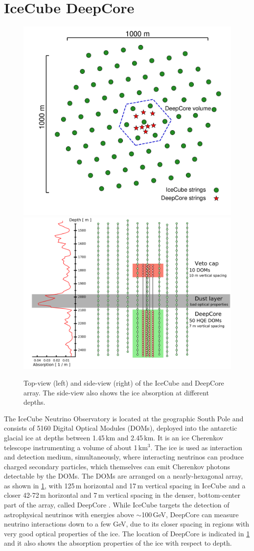 \documentclass[a4paper,11pt]{article}
\begin{document}
\section{IceCube DeepCore}

\begin{figure}[h]
  \includegraphics[width=.43\linewidth]{figures/icecube_top_view_bw.pdf}
  \includegraphics[width=.52\linewidth]{figures/DeepCore_sideview.png}
  \caption{Top-view (left) and side-view (right) of the IceCube and DeepCore array. The side-view also shows the ice absorption at different depths.}
  \label{fig:icecube_array}
\end{figure}

The IceCube Neutrino Observatory \cite{Aartsen:2016nxy} is located at the geographic South Pole and consists of 5160 Digital Optical Modules (DOMs), deployed into the antarctic glacial ice at depths between 1.45\,km and 2.45\,km. It is an ice Cherenkov telescope instrumenting a volume of about 1\,km$^{3}$. The ice is used as interaction and detection medium, simultaneously, where interacting neutrinos can produce charged secondary particles, which themselves can emit Cherenkov photons detectable by the DOMs. The DOMs are arranged on a nearly-hexagonal array, as shown in \cref{fig:icecube_array}, with 125\,m horizontal and 17\,m vertical spacing in IceCube and a closer 42-72\,m horizontal and 7\,m vertical spacing in the denser, bottom-center part of the array, called DeepCore \cite{IceCube:2011ucd}. While IceCube targets the detection of astrophysical neutrinos with energies above $\sim$100\,GeV, DeepCore can measure neutrino interactions down to a few GeV, due to its closer spacing in regions with very good optical properties of the ice. The location of DeepCore is indicated in \cref{fig:icecube_array} and it also shows the absorption properties of the ice with respect to depth.
\end{document}
